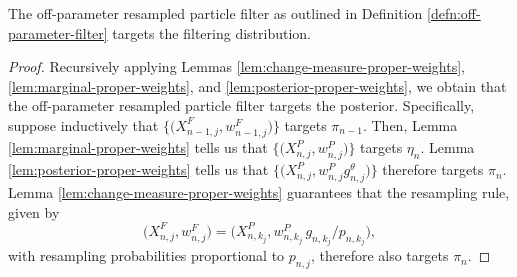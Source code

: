     


\begin{thm}
    \label{thm:off-parameter-targeting}
    The off-parameter resampled particle filter as outlined in Definition \ref{defn:off-parameter-filter} targets the filtering distribution.
\end{thm}
\begin{proof}
    Recursively applying Lemmas \ref{lem:change-measure-proper-weights}, \ref{lem:marginal-proper-weights}, and \ref{lem:posterior-proper-weights}, we obtain that the off-parameter resampled particle filter targets the posterior.
    Specifically, suppose inductively that $\big\{\big(X^{F}_{n-1,j},w^{F}_{n-1,j}\big)\big\}$ targets $\pi_{n-1}$.
    Then, Lemma \ref{lem:marginal-proper-weights} tells us that $\big\{\big(X^{P}_{n,j},w^{P}_{n,j}\big)\big\}$ targets $\eta_n$.
    Lemma \ref{lem:posterior-proper-weights} tells us that $\big\{\big(X^{P}_{n,j},w^{P}_{n,j} g^\theta_{n,j} \big)\big\}$ therefore targets  $\pi_n$.
    Lemma \ref{lem:change-measure-proper-weights} guarantees that the resampling rule, given by 
    \begin{equation}
    \big(X^{F}_{n,j},w^{F}_{n,j}\big) = \big(X^{P}_{n,k_j}, w^{P}_{n,k_j} \, g_{n,k_j}\big/ p_{n,k_j}\big),
    \end{equation}
    with resampling probabilities proportional to $p_{n,j}$, therefore also targets $\pi_n$.
\end{proof}

